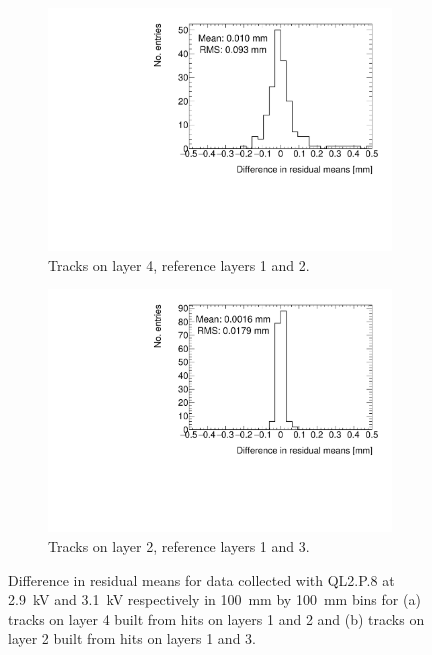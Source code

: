 \begin{figure}
\centering
\begin{subfigure}{.5\textwidth}
  \centering
  \includegraphics[width=\linewidth]{figures/figure_compare_residual_fits_QL2P08_2900V_2021-05-21_minus_QL2P08_3100V_2021-05-21_layer4_fixedlayers12_mean_differences.pdf}
  \caption{Tracks on layer 4, reference layers 1 and 2.}
  \label{fig:voltage_compare_fits_412}
\end{subfigure}%
\begin{subfigure}{.5\textwidth}
  \centering
  \includegraphics[width=\linewidth]{figures/figure_compare_residual_fits_QL2P08_2900V_2021-05-21_minus_QL2P08_3100V_2021-05-21_layer2_fixedlayers13_mean_differences.pdf}
  \caption{Tracks on layer 2, reference layers 1 and 3.}
  \label{fig:voltage_compare_fits_213}
\end{subfigure}
\caption{Difference in residual means for data collected with QL2.P.8 at 2.9~kV and 3.1~kV respectively in \SI{100}{\milli\meter} by \SI{100}{\milli\meter} bins for (a) tracks on layer 4 built from hits on layers 1 and 2 and (b) tracks on layer 2 built from hits on layers 1 and 3.}
\label{fig:voltage_compare_fits}
\end{figure}

